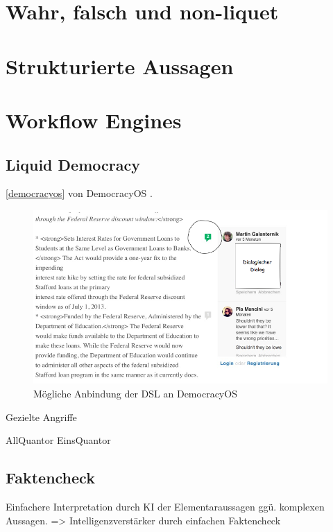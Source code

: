 \documentclass[11pt,a4paper,bibtotocnumbered]{scrreprt}
\begin{document}
\section{Wahr, falsch und non-liquet} %

\section{Strukturierte Aussagen} %



\section{Workflow Engines} %

\subsection{Liquid Democracy} %

\autoref{democracyos} von DemocracyOS \cite{DemocracyOS}.

\begin{figure}[htbp]
\centering
\includegraphics[width=1\textwidth]{img/democracyos.png}
\caption{Mögliche Anbindung der DSL an DemocracyOS}
\label{democracyos}
\end{figure}

Gezielte Angriffe

AllQuantor
EinsQuantor

\subsection{Faktencheck} %

Einfachere Interpretation durch KI der Elementaraussagen ggü. komplexen Aussagen.  => Intelligenzverstärker durch einfachen Faktencheck
\end{document}
